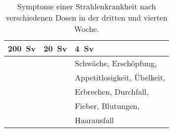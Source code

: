 \begin{table}
	\caption{Symptome einer Strahlenkrankheit nach verschiedenen Dosen in der dritten und vierten Woche.\cite{AnnuRev18_2}}
		\begin{tabular}{lll}
			\toprule
	 		\SI{200}{\sievert} & \SI{20}{\sievert}& \SI{4}{\sievert}\\
			\midrule
			\phantom{Hautrötung, Desorientierung,} & & Schwäche, Erschöpfung, \\
			&\phantom{Hautrötung, Desorientierung,}  & Appetitlosigkeit, Übelkeit,\\
			& & Erbrechen, Durchfall,\\
			& & Fieber, Blutungen, \\
			& & Haarausfall
		\end{tabular}

\end{table}
